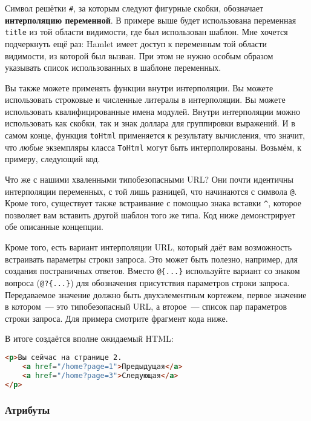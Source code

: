 Символ решётки \lstinline'#', за которым следуют фигурные скобки, обозначает
\textbf{интерполяцию переменной}. В примере выше будет использована переменная
\lstinline'title' из той области видимости, где был использован шаблон. Мне
хочется подчеркнуть ещё раз: Hamlet имеет доступ к переменным той
области видимости, из которой был вызван.  При этом не нужно особым образом
указывать список использованных в шаблоне переменных.

Вы также можете применять функции внутри интерполяции. Вы можете использовать
строковые и численные литералы в интерполяции. Вы можете использовать
квалифицированные имена модулей.  Внутри интерполяции можно использовать как
скобки, так и знак доллара для группировки выражений. И в самом конце, функция
\lstinline'toHtml' применяется к результату вычисления, что значит, что
\emph{любые} экземпляры класса \lstinline'ToHtml' могут быть интерполированы.
Возьмём, к примеру, следующий код.


Что же с нашими хваленными типобезопасными URL? Они почти идентичны
интерполяции переменных, с той лишь разницей, что начинаются с символа
\lstinline'@'. Кроме того, существует также встраивание с помощью знака вставки
\lstinline'^', которое позволяет вам вставить другой шаблон того же типа.  Код
ниже демонстрирует обе описанные концепции.


Кроме того, есть вариант интерполяции URL, который даёт вам возможность
встраивать параметры строки запроса. Это может быть полезно, например, для
создания постраничных ответов. Вместо \lstinline'@{...}' используйте вариант со
знаком вопроса (\lstinline'@?{...}') для обозначения присутствия параметров
строки запроса. Передаваемое значение должно быть двухэлементным кортежем,
первое значение в котором~--- это типобезопасный URL, а второе~--- список пар
параметров строки запроса. Для примера смотрите фрагмент кода ниже.


В итоге создаётся вполне ожидаемый HTML:
\begin{lstlisting}[language=HTML]
<p>Вы сейчас на странице 2.
    <a href="/home?page=1">Предыдущая</a>
    <a href="/home?page=3">Следующая</a>
</p>
\end{lstlisting}

\subsubsection{Атрибуты}

